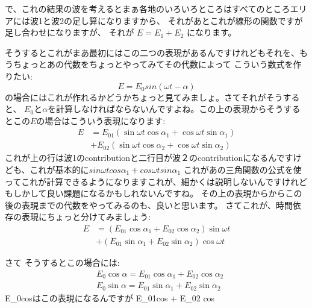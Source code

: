 で、これの結果の波を考えるとまぁ各地のいろいろところはすべてのところエリアには波1と波2の足し算になりますから、 
それがあとこれが線形の関数ですが足し合わせになりますが、
それが $E = E_1 + E_2$ になります。

そうするとこれがまあ最初にはこの二つの表現があるんですけれどもそれを、もうちょっとあの代数をちょっとやってみてその代数によって
こういう数式を作りたい:
\begin{equation}
E = E_0 sin(\omega t - \alpha)
\end{equation}
の場合にはこれが作れるかどうかちょっと見てみましょ。さてそれがそうすると、
$E_0$と$\alpha$を計算しなければならないんですよね。この上の表現からそうするとこの$E$の場合はこういう表現になります:
\begin{equation}
\begin{aligned}
E &=E_{01}\left(\sin \omega t \cos \alpha_{1}+\cos \omega t \sin \alpha_{1}\right) \\
&+E_{02}\left(\sin \omega t \cos \alpha_{2}+\cos \omega t \sin \alpha_{2}\right)
\end{aligned}
\end{equation}
これが上の行は波1のcontributionと二行目が波２のcontributionになるんですけども、これが基本的に$sin\omega t cos\alpha_{1}  + cos\omega t sin \alpha_{1} $ 
これがあの三角関数の公式を使ってこれが計算できるようになりますこれが、細かくは説明しないんですけれどもしかして良い課題になるかもしれないんですね。
その上の表現からからこの後の表現までの代数をやってみるのも、良いと思います。
さてこれが、時間依存の表現にちょっと分けてみましょう:
\begin{equation}
\begin{aligned}
E &=\left(E_{01} \cos \alpha_{1}+E_{02} \cos \alpha_{2}\right) \sin \omega t \\
&+\left(E_{01} \sin \alpha_{1}+E_{02} \sin \alpha_{2}\right) \cos \omega t
\end{aligned}
\end{equation}

さて そうするとこの場合には:
\begin{equation}
\begin{aligned}
&E_{0} \cos \alpha=E_{01} \cos \alpha_{1}+E_{02} \cos \alpha_{2} \\
&E_{0} \sin \alpha=E_{01} \sin \alpha_{1}+E_{02} \sin \alpha_{2}
\end{aligned}
\end{equation}
\iffalse
E_0cos\alpha はこの表現になるんですが 
E_01cos +  E_02 cos

